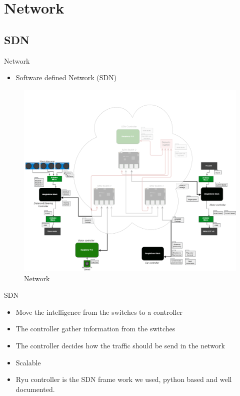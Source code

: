 \documentclass{beamer}
\begin{document}

\section{Network}
\subsection{SDN}
\begin{frame}{Network}
    \begin{itemize}
        \item Software defined Network (SDN)
    \end{itemize}
    \begin{figure}
        \includegraphics[width=0.6\linewidth]{network.png}
        \caption{Network}
    \end{figure}
\end{frame}


\begin{frame}{SDN}
    \begin{itemize}
        \item Move the intelligence from the switches to a controller
        \item The controller gather information from the switches
        \item The controller decides how the traffic should be send in the network
        \item Scalable
        \item Ryu controller is the SDN frame work we used, python based and well documented.          
    \end{itemize}
    
\end{frame}{}
\end{document}
